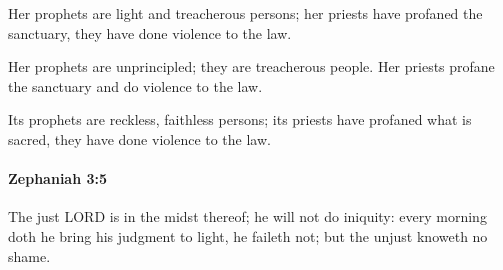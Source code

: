 			\begin{versebox}
					\item[BHS] 
					\item[LXX] 
					\item[ASV] Her prophets are light and treacherous persons; her priests have profaned the sanctuary, they have done violence to the law.
					\item[NIV] Her prophets are unprincipled; they are treacherous people. Her priests profane the sanctuary and do violence to the law.
					\item[NRSV] Its prophets are reckless, faithless persons; its priests have profaned what is sacred, they have done violence to the law.
			\end{versebox}

		\paragraph{Zephaniah 3:5} %
			\label{ZEPHANIAH-3-5}

			The just LORD is in the midst thereof; he will not do iniquity: every morning doth he bring his judgment to light, he faileth not; but the unjust knoweth no shame.

